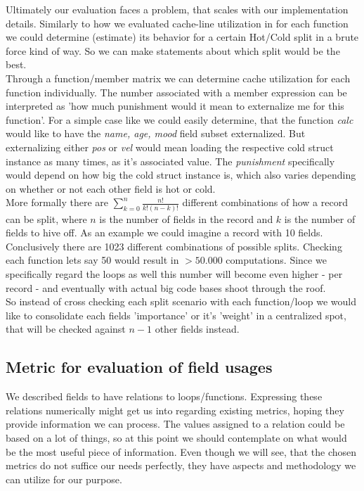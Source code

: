 Ultimately our evaluation faces a problem, that scales with our implementation details. Similarly to how we evaluated cache-line utilization in  for each function we could determine (estimate) its behavior for a certain Hot/Cold split in a brute force kind of way. So we can make statements about which split would be the best.\\
Through a function/member matrix we can determine cache utilization for each function individually. The number associated with a member expression can be interpreted as 'how much punishment would it mean to externalize me for this function'. For a simple case like  we could easily determine, that the function \textit{calc} would like to have the \textit{name, age, mood} field subset externalized. But externalizing either \textit{pos} or \textit{vel} would mean loading the respective cold struct instance as many times, as it's associated value. The \textit{punishment} specifically would depend on how big the cold struct instance is, which also varies depending on whether or not each other field is hot or cold.\\
More formally there are $\sum_{k=0}^{n} \frac{n!}{k!(n-k)!}$ different combinations of how a record can be split, where $n$ is the number of fields in the record and $k$ is the number of fields to hive off. As an example we could imagine a record with 10 fields. Conclusively there are 1023 different combinations of possible splits. Checking each function lets say 50 would result in $> 50.000$ computations. Since we specifically regard the loops as well this number will become even higher - per record - and eventually with actual big code bases shoot through the roof.\\
So instead of cross checking each split scenario with each function/loop we would like to consolidate each fields 'importance' or it's 'weight' in a centralized spot, that will be checked against $n-1$ other fields instead.

\subsection{Metric for evaluation of field usages}\label{metrics}
We described fields to have relations to loops/functions. Expressing these relations numerically might get us into regarding existing metrics, hoping they provide information we can process. The values assigned to a relation could be based on a lot of things, so at this point we should contemplate on what would be the most useful piece of information. Even though we will see, that the chosen metrics do not suffice our needs perfectly, they have aspects and methodology we can utilize for our purpose.
